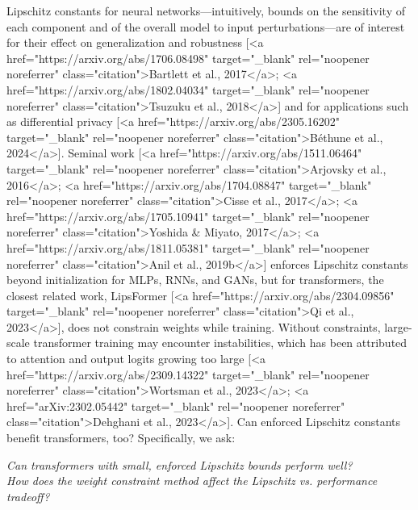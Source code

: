 Lipschitz constants for neural networks---intuitively, bounds on the sensitivity of each component and of the overall model to input perturbations---are of interest for their effect on generalization and robustness [<a href="https://arxiv.org/abs/1706.08498" target="_blank" rel="noopener noreferrer" class="citation">Bartlett et al., 2017</a>; <a href="https://arxiv.org/abs/1802.04034" target="_blank" rel="noopener noreferrer" class="citation">Tsuzuku et al., 2018</a>] and for applications such as differential privacy [<a href="https://arxiv.org/abs/2305.16202" target="_blank" rel="noopener noreferrer" class="citation">B{\'e}thune et al., 2024</a>]. Seminal work [<a href="https://arxiv.org/abs/1511.06464" target="_blank" rel="noopener noreferrer" class="citation">Arjovsky et al., 2016</a>; <a href="https://arxiv.org/abs/1704.08847" target="_blank" rel="noopener noreferrer" class="citation">Cisse et al., 2017</a>; <a href="https://arxiv.org/abs/1705.10941" target="_blank" rel="noopener noreferrer" class="citation">Yoshida & Miyato, 2017</a>; <a href="https://arxiv.org/abs/1811.05381" target="_blank" rel="noopener noreferrer" class="citation">Anil et al., 2019b</a>] enforces Lipschitz constants beyond initialization for MLPs, RNNs, and GANs, but for transformers, the closest related work, LipsFormer [<a href="https://arxiv.org/abs/2304.09856" target="_blank" rel="noopener noreferrer" class="citation">Qi et al., 2023</a>], does not constrain weights while training. Without constraints, large-scale transformer training may encounter instabilities, which has been attributed to attention and output logits growing too large [<a href="https://arxiv.org/abs/2309.14322" target="_blank" rel="noopener noreferrer" class="citation">Wortsman et al., 2023</a>; <a href="arXiv:2302.05442" target="_blank" rel="noopener noreferrer" class="citation">Dehghani et al., 2023</a>]. Can enforced Lipschitz constants benefit transformers, too? Specifically, we ask:

\begin{center}
    \textit{Can transformers with small, enforced Lipschitz bounds perform well?\\
    How does the weight constraint method affect the Lipschitz vs. performance tradeoff?}
\end{center}

